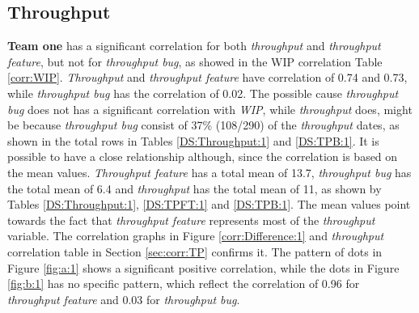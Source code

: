 \documentclass[UKenglish]{ifimaster}  %
\begin{document}
\subsection{Throughput}
\textbf{Team one} has a significant correlation  for both \textit{throughput} and \textit{throughput feature}, but not for \textit{throughput bug}, as showed in the WIP correlation Table \ref{corr:WIP}. \textit{Throughput} and \textit{throughput feature} have correlation of  0.74 and 0.73, while \textit{throughput bug} has the correlation of 0.02. The possible cause \textit{throughput bug} does not has a  significant correlation with \textit{WIP}, while \textit{throughput} does, might be because \textit{throughput bug} consist of 37\% (108/290) of the \textit{throughput} dates, as shown in the total rows in Tables \ref{DS:Throughput:1} and \ref{DS:TPB:1}. It is possible to have a close relationship although, since the correlation is based on the mean values. \textit{Throughput feature} has a total mean of 13.7, \textit{throughput bug} has the total mean of 6.4 and \textit{throughput} has the total mean of 11, as shown by Tables  \ref{DS:Throughput:1}, \ref{DS:TPFT:1} and \ref{DS:TPB:1}. The mean values point towards the fact that \textit{throughput feature} represents most of the \textit{throughput} variable. The correlation  graphs in Figure \ref{corr:Difference:1}  and \textit{throughput} correlation table in Section \ref{sec:corr:TP} confirms it. The pattern of dots in Figure \ref{fig:a:1} shows a significant positive correlation, while the dots in Figure \ref{fig:b:1} has no specific pattern, which reflect the correlation of 0.96 for \textit{throughput feature} and 0.03 for \textit{throughput bug}.
\end{document}
